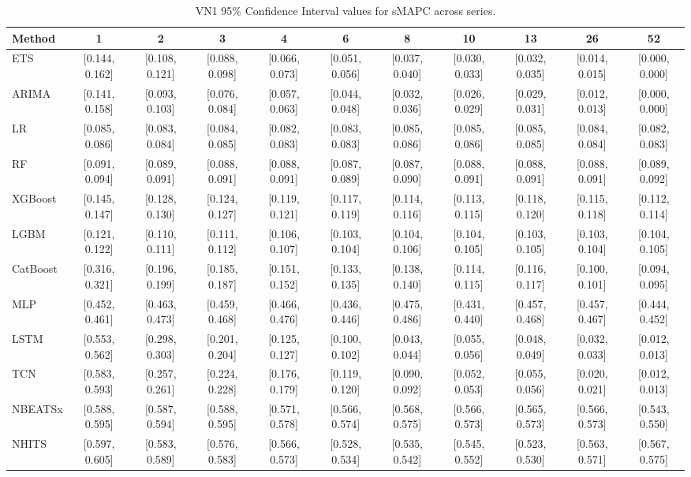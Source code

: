 \begin{table}[!ht]
\centering
\begin{adjustbox}{max width=\textwidth}
\begin{tabular}{lcccccccccc}
\toprule
Method & 1 & 2 & 3 & 4 & 6 & 8 & 10 & 13 & 26 & 52 \\
\midrule
ETS & [0.144, 0.162] & [0.108, 0.121] & [0.088, 0.098] & [0.066, 0.073] & [0.051, 0.056] & [0.037, 0.040] & [0.030, 0.033] & [0.032, 0.035] & [0.014, 0.015] & [0.000, 0.000] \\
ARIMA & [0.141, 0.158] & [0.093, 0.103] & [0.076, 0.084] & [0.057, 0.063] & [0.044, 0.048] & [0.032, 0.036] & [0.026, 0.029] & [0.029, 0.031] & [0.012, 0.013] & [0.000, 0.000] \\
LR & [0.085, 0.086] & [0.083, 0.084] & [0.084, 0.085] & [0.082, 0.083] & [0.083, 0.083] & [0.085, 0.086] & [0.085, 0.086] & [0.085, 0.085] & [0.084, 0.084] & [0.082, 0.083] \\
RF & [0.091, 0.094] & [0.089, 0.091] & [0.088, 0.091] & [0.088, 0.091] & [0.087, 0.089] & [0.087, 0.090] & [0.088, 0.091] & [0.088, 0.091] & [0.088, 0.091] & [0.089, 0.092] \\
XGBoost & [0.145, 0.147] & [0.128, 0.130] & [0.124, 0.127] & [0.119, 0.121] & [0.117, 0.119] & [0.114, 0.116] & [0.113, 0.115] & [0.118, 0.120] & [0.115, 0.118] & [0.112, 0.114] \\
LGBM & [0.121, 0.122] & [0.110, 0.111] & [0.111, 0.112] & [0.106, 0.107] & [0.103, 0.104] & [0.104, 0.106] & [0.104, 0.105] & [0.103, 0.105] & [0.103, 0.104] & [0.104, 0.105] \\
CatBoost & [0.316, 0.321] & [0.196, 0.199] & [0.185, 0.187] & [0.151, 0.152] & [0.133, 0.135] & [0.138, 0.140] & [0.114, 0.115] & [0.116, 0.117] & [0.100, 0.101] & [0.094, 0.095] \\
MLP & [0.452, 0.461] & [0.463, 0.473] & [0.459, 0.468] & [0.466, 0.476] & [0.436, 0.446] & [0.475, 0.486] & [0.431, 0.440] & [0.457, 0.468] & [0.457, 0.467] & [0.444, 0.452] \\
LSTM & [0.553, 0.562] & [0.298, 0.303] & [0.201, 0.204] & [0.125, 0.127] & [0.100, 0.102] & [0.043, 0.044] & [0.055, 0.056] & [0.048, 0.049] & [0.032, 0.033] & [0.012, 0.013] \\
TCN & [0.583, 0.593] & [0.257, 0.261] & [0.224, 0.228] & [0.176, 0.179] & [0.119, 0.120] & [0.090, 0.092] & [0.052, 0.053] & [0.055, 0.056] & [0.020, 0.021] & [0.012, 0.013] \\
NBEATSx & [0.588, 0.595] & [0.587, 0.594] & [0.588, 0.595] & [0.571, 0.578] & [0.566, 0.574] & [0.568, 0.575] & [0.566, 0.573] & [0.565, 0.573] & [0.566, 0.573] & [0.543, 0.550] \\
NHITS & [0.597, 0.605] & [0.583, 0.589] & [0.576, 0.583] & [0.566, 0.573] & [0.528, 0.534] & [0.535, 0.542] & [0.545, 0.552] & [0.523, 0.530] & [0.563, 0.571] & [0.567, 0.575] \\
\bottomrule
\end{tabular}
\end{adjustbox}
\caption{VN1 95\% Confidence Interval values for sMAPC across series.}
\label{tab:ci_vn1_smapc}
\end{table}

